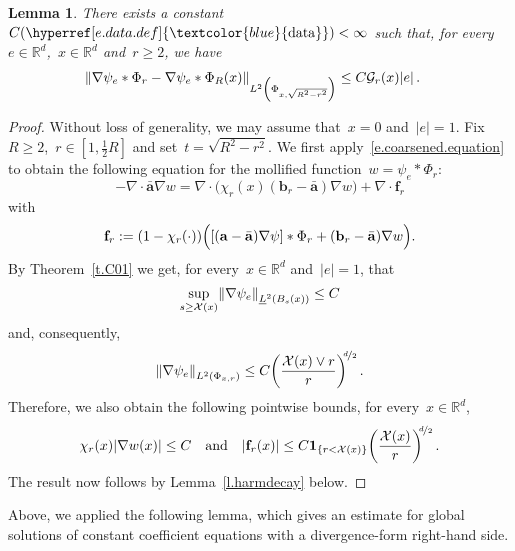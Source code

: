 \documentclass[11pt,twoside]{article} %
\numberwithin{equation}{section}
\newtheorem{lemma}[theorem]{Lemma}
\theoremstyle{definition}
\newcommand{\dataref}{\hyperref[e.data.def]{\textcolor{blue}{\ensuremath{\mathrm{data}}}}}
\let\originalleft\left
\let\originalright\right
\renewcommand{\left}{\mathopen{}\mathclose\bgroup\originalleft}
\renewcommand{\right}{\aftergroup\egroup\originalright}
\newcommand*{\R}{\ensuremath{\mathbb{R}}}
\renewcommand{\b}{\ensuremath{\mathbf{b}}}
\newcommand{\qand}{\quad \mbox{and} \quad }
\newcommand{\f}{\mathbf{f}}
\renewcommand{\a}{\mathbf{a}}
\newcommand{\ahom}{\bar{\a}}
\newcommand{\X}{\mathcal{X}}
\newcommand{\indc}{\boldsymbol{1}}
\newcommand{\minscale}{\chi}
\begin{document}
\begin{lemma}
\label{l.scalecomparison}
There exists a constant~$C(\dataref)<\infty$ such that, for every~$e \in \R^d$,~$x\in \R^d$ and~$r \geq 2$,  we have
\begin{align}
\label{e.scalecomparison}
\left\| \nabla \psi_e \ast \Phi_r  - \nabla \psi_e \ast \Phi_R(x)\right\|_{L^2 \left( \Phi_{x,\sqrt{R^2 - r^2}} \right)} 
& \leq 
C \mathcal{G}_r(x) |e|
\,.
\end{align}
\end{lemma}
\begin{proof}
Without loss of generality, we may assume that~$x=0$ and~$|e|=1$.  Fix~$R \geq 2$,~$r \in [1,\frac12 R]$  and set~$t = \sqrt{R^2-r^2}$. We first apply~\eqref{e.coarsened.equation} to obtain the following equation for the mollified function~$w = \psi_e \ast \Phi_r$:
\begin{equation*}  
-\nabla \cdot \ahom \nabla w = 
\nabla \cdot \bigl( \minscale_r(x)  (\b_r - \ahom) \nabla w \bigr) + \nabla \cdot \f_{r} 
\end{equation*}
with
\begin{equation*}  
\f_{r} := (1-\minscale_r(\cdot) ) \Bigl( [(\a - \ahom) \nabla \psi] \ast \Phi_{r} + (\b_r - \ahom) \nabla w\Bigr) 
.
\end{equation*}
By Theorem~\ref{t.C01} we get, for every~$x\in\R^d$ and~$|e|=1$, that
\begin{equation} \label{e.corr.grad.bound.pre}
\sup_{s \geq \X(x)}\left\| \nabla \psi_e \right\|_{\underline{L}^2 \left( B_{s}(x) \right)} 
\leq 
C
\end{equation}
and, consequently,
\begin{equation}  \label{e.corr.grad.bound}
\left\| \nabla \psi_e \right\|_{L^2(\Phi_{x,r})} 
\leq 
C  \biggl( \frac{\X(x) \vee r}{r} \biggr)^{\!\!\nicefrac d2} 
\,.
\end{equation}
Therefore, we also obtain the following pointwise bounds, for every~$x\in\R^d$, 
\begin{equation*}  
\minscale_r(x) | \nabla w(x)| \leq C \qand |\f_{r}(x)| \leq C  \indc_{\{r< \X(x)\}}  \biggl( \frac{\X (x)}{r} \biggr)^{\!\!\nicefrac d2} 
\,.
\end{equation*}
The result now follows by Lemma~\ref{l.harmdecay} below. 
\end{proof}

Above, we applied the following lemma, which gives an estimate for global solutions of constant coefficient equations with a divergence-form right-hand side. 
\end{document}
